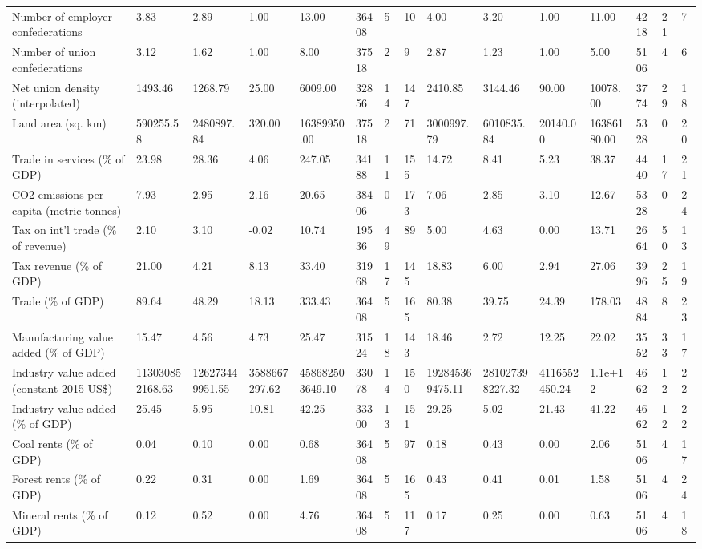 \begin{longtable}{lllllllllllllll}
\addlinespace
Number of employer confederations & 3.83 & 2.89 & 1.00 & 13.00 & 36408 & 5 & 10 & 4.00 & 3.20 & 1.00 & 11.00 & 4218 & 21 & 7\\
Number of union confederations & 3.12 & 1.62 & 1.00 & 8.00 & 37518 & 2 & 9 & 2.87 & 1.23 & 1.00 & 5.00 & 5106 & 4 & 6\\
Net union density (interpolated) & 1493.46 & 1268.79 & 25.00 & 6009.00 & 32856 & 14 & 147 & 2410.85 & 3144.46 & 90.00 & 10078.00 & 3774 & 29 & 18\\
Land area (sq. km) & 590255.58 & 2480897.84 & 320.00 & 16389950.00 & 37518 & 2 & 71 & 3000997.79 & 6010835.84 & 20140.00 & 16386180.00 & 5328 & 0 & 20\\
Trade in services (\% of GDP) & 23.98 & 28.36 & 4.06 & 247.05 & 34188 & 11 & 155 & 14.72 & 8.41 & 5.23 & 38.37 & 4440 & 17 & 21\\
\addlinespace
CO2 emissions per capita (metric tonnes) & 7.93 & 2.95 & 2.16 & 20.65 & 38406 & 0 & 173 & 7.06 & 2.85 & 3.10 & 12.67 & 5328 & 0 & 24\\
Tax on int'l trade (\% of revenue) & 2.10 & 3.10 & -0.02 & 10.74 & 19536 & 49 & 89 & 5.00 & 4.63 & 0.00 & 13.71 & 2664 & 50 & 13\\
Tax revenue (\% of GDP) & 21.00 & 4.21 & 8.13 & 33.40 & 31968 & 17 & 145 & 18.83 & 6.00 & 2.94 & 27.06 & 3996 & 25 & 19\\
Trade (\% of GDP) & 89.64 & 48.29 & 18.13 & 333.43 & 36408 & 5 & 165 & 80.38 & 39.75 & 24.39 & 178.03 & 4884 & 8 & 23\\
Manufacturing value added (\% of GDP) & 15.47 & 4.56 & 4.73 & 25.47 & 31524 & 18 & 143 & 18.46 & 2.72 & 12.25 & 22.02 & 3552 & 33 & 17\\
\addlinespace
Industry value added (constant 2015 US\$) & 113030852168.63 & 126273449951.55 & 3588667297.62 & 458682503649.10 & 33078 & 14 & 150 & 192845369475.11 & 281027398227.32 & 4116552450.24 & 1.1e+12 & 4662 & 12 & 22\\
Industry value added (\% of GDP) & 25.45 & 5.95 & 10.81 & 42.25 & 33300 & 13 & 151 & 29.25 & 5.02 & 21.43 & 41.22 & 4662 & 12 & 22\\
Coal rents (\% of GDP) & 0.04 & 0.10 & 0.00 & 0.68 & 36408 & 5 & 97 & 0.18 & 0.43 & 0.00 & 2.06 & 5106 & 4 & 17\\
Forest rents (\% of GDP) & 0.22 & 0.31 & 0.00 & 1.69 & 36408 & 5 & 165 & 0.43 & 0.41 & 0.01 & 1.58 & 5106 & 4 & 24\\
Mineral rents (\% of GDP) & 0.12 & 0.52 & 0.00 & 4.76 & 36408 & 5 & 117 & 0.17 & 0.25 & 0.00 & 0.63 & 5106 & 4 & 18\\

\end{longtable}
